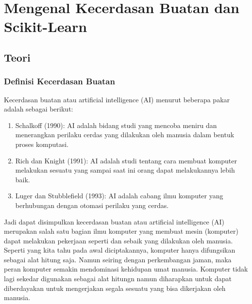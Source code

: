 \chapter{Mengenal Kecerdasan Buatan dan Scikit-Learn}
\section{Teori}
\subsection{Definisi Kecerdasan Buatan}
\hfill\break
Kecerdasan buatan atau artificial intelligence (AI) menurut beberapa pakar adalah sebagai berikut:
\begin{enumerate}
	\item Schalkoff (1990): AI adalah bidang studi yang mencoba meniru dan menerangkan perilaku cerdas yang dilakukan oleh manusia dalam bentuk proses komputasi.
	\item Rich dan Knight (1991): AI adalah studi tentang cara membuat komputer melakukan sesuatu yang sampai saat ini orang dapat melakukannya lebih baik.
	\item Luger dan Stubblefield (1993): AI adalah cabang ilmu komputer yang berhubungan dengan otomasi perilaku yang cerdas.
\end{enumerate}

\noindent
Jadi dapat disimpulkan kecerdasan buatan atau artificial intelligence (AI) merupakan salah satu bagian ilmu komputer yang membuat mesin (komputer) dapat melakukan pekerjaan seperti dan sebaik yang dilakukan oleh manusia. Seperti yang kita tahu pada awal diciptakannya, komputer hanya difungsikan sebagai alat hitung saja. Namun seiring dengan perkembangan jaman, maka peran komputer semakin mendominasi kehidupan umat manusia. Komputer tidak lagi sekedar digunakan sebagai alat hitungn namun diharapkan untuk dapat diberdayakan untuk mengerjakan segala sesuatu yang bisa dikerjakan oleh manusia.

